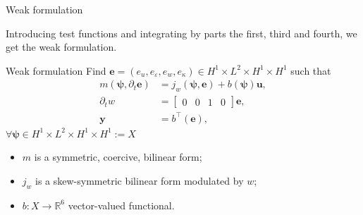 \documentclass[serif]{beamer} %
\newcommand{\bbR}{\mathbb{R}}
\begin{document}
\begin{frame}{Weak formulation}
	
	Introducing test functions and integrating by parts the first, third and fourth, we get the weak formulation.
	
	\begin{block}{Weak formulation}
		Find $\bm{e} =(e_u,  e_\varepsilon, e_w, e_\kappa) \in H^1\times L^2\times H^1\times H^1$ such that 
		\begin{equation*}
			\begin{aligned}
				m(\bm{\psi}, \partial_t \bm{e}) &= j_w(\bm{\psi}, \bm{e}) + b(\bm{\psi})\mathbf{u},\\
				\partial_t w &= \begin{bmatrix}
					0 & 0 & 1 & 0
				\end{bmatrix}\bm{e}, \\
				\mathbf{y} &= b^\top(\bm{e}),
			\end{aligned} 
		\end{equation*}
		$\forall \bm{\psi} \in H^1\times L^2\times H^1\times H^1:= X$
		\begin{itemize}
			\item $m$ is a symmetric, coercive, bilinear form;
			\item $j_w$ is a skew-symmetric bilinear form modulated by $w$;
			\item $b: X \rightarrow \bbR^6$ vector-valued functional.
		\end{itemize}  
	\end{block}
\end{frame}
\end{document}
